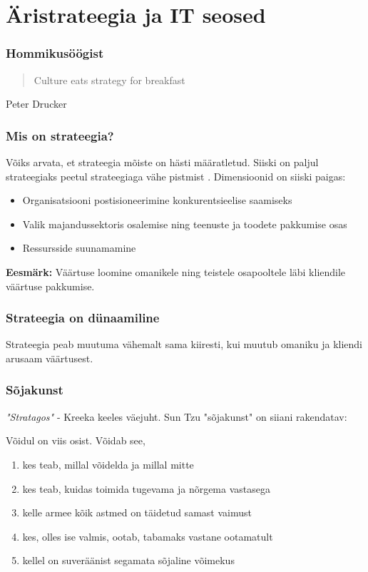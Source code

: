 \section{Äristrateegia ja IT seosed}

\begin{frame}[fragile]
  \frametitle{Hommikusöögist}
  \begin{quote}
    Culture eats strategy for breakfast
  \end{quote}
	Peter Drucker
\end{frame}


\begin{frame}[fragile]
  \frametitle{Mis on strateegia?}
  	Võiks arvata, et strateegia mõiste on hästi määratletud. Siiski on paljul strateegiaks peetul strateegiaga vähe pistmist \citep{de2006strategy}. Dimensioonid on siiski paigas:
	\begin{itemize}
		\item Organisatsiooni postisioneerimine konkurentsieelise saamiseks
		\item Valik majandussektoris osalemise ning teenuste ja toodete pakkumise osas
		\item Ressursside suunamamine 
	\end{itemize}
	\textbf{Eesmärk:} Väärtuse loomine omanikele ning teistele osapooltele läbi kliendile väärtuse pakkumise.
\end{frame}

\begin{frame}[fragile]
  \frametitle{Strateegia on dünaamiline}
	\vfill
	\begin{center}
		Strateegia peab muutuma vähemalt sama kiiresti, kui muutub omaniku ja kliendi arusaam väärtusest.
	\end{center}
	\vfill
\end{frame}


\begin{frame}[fragile]
  \frametitle{Sõjakunst}
  \emph{"Stratagos"} - Kreeka keeles väejuht. Sun Tzu "sõjakunst" \citep{tzu2013art} on siiani rakendatav:
  
  Võidul on viis osist. Võidab see, 
   \begin{enumerate}
   		\item kes teab, millal võidelda ja millal mitte
		\item kes teab, kuidas toimida tugevama ja nõrgema vastasega
		\item kelle armee kõik astmed on täidetud samast vaimust
		\item kes, olles ise valmis, ootab, tabamaks vastane ootamatult
		\item kellel on suveräänist segamata sõjaline võimekus
   \end{enumerate}
\end{frame}

